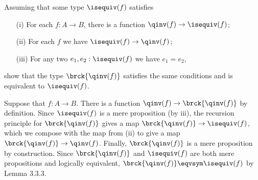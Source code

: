 Assuming that some type $\isequiv(f)$ satisfies
\begin{itemize}
  \item[(i)] For each $f : A \to B$, there is a function $\qinv(f) \to \isequiv(f)$;
  \item[(ii)] For each $f$ we have $\isequiv(f) \to \qinv(f)$;
  \item[(iii)] For any two $e_{1}, e_{2} : \isequiv(f)$ we have $e_{1} = e_{2}$,
\end{itemize}
show that the type $\brck{\qinv(f)}$ satisfies the same conditions and is
equivalent to $\isequiv(f)$.


 \soln
Suppose that $f : A \to B$.  There is a function $\qinv(f) \to \brck{\qinv(f)}$
by definition.  Since $\isequiv(f)$ is a mere proposition (by iii), the
recursion principle for $\brck{\qinv(f)}$ gives a map $\brck{\qinv(f)} \to
\isequiv(f)$, which we compose with the map from (ii) to give a map
$\brck{\qinv(f)} \to \qinv(f)$.  Finally, $\brck{\qinv(f)}$ is a mere
proposition by construction.  Since $\brck{\qinv(f)}$ and $\isequiv(f)$ are
both mere propositions and logically equivalent, $\brck{\qinv(f)} \eqvsym
\isequiv(f)$ by Lemma 3.3.3.
